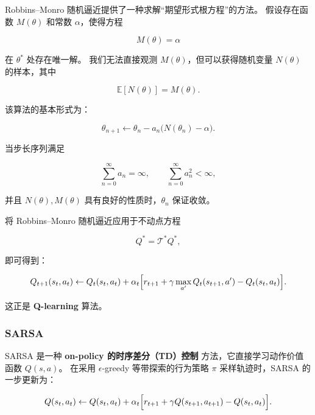 \documentclass[oneside]{ctexbook}
\begin{document}
Robbins--Monro 随机逼近提供了一种求解“期望形式根方程”的方法。
假设存在函数 $M(\theta)$ 和常数 $\alpha$，使得方程

\begin{equation}
M(\theta) = \alpha
\end{equation}

在 $\theta^\ast$ 处存在唯一解。
我们无法直接观测 $M(\theta)$，但可以获得随机变量 $N(\theta)$ 的样本，其中

\begin{equation}
\mathbb E[N(\theta)] = M(\theta).
\end{equation}

该算法的基本形式为：

\begin{equation}
\theta_{n+1}
\gets
\theta_n - a_n \bigl(N(\theta_n) - \alpha \bigr).
\end{equation}

当步长序列满足

\begin{equation}
\sum_{n=0}^\infty a_n = \infty,
\qquad
\sum_{n=0}^\infty a_n^2 < \infty,
\end{equation}

并且 $N(\theta), M(\theta)$ 具有良好的性质时，$\theta_n$ 保证收敛。

将 Robbins--Monro 随机逼近应用于不动点方程

\begin{equation}
Q^\ast = \mathcal T^\ast Q^\ast,
\end{equation}

即可得到：

\begin{equation}
Q_{t+1}(s_t,a_t)
\gets
Q_t(s_t,a_t)
+
\alpha_t
\Bigl[
r_{t+1}
+
\gamma \max_{a^\prime} Q_t(s_{t+1},a^\prime)
-
Q_t(s_t,a_t)
\Bigr].
\end{equation}

这正是 \textbf{Q-learning} 算法。

\subsubsection{SARSA}

SARSA 是一种 \textbf{on-policy 的时序差分（TD）控制} 方法，它直接学习动作价值函数 $Q(s,a)$。
在采用 $\epsilon$-greedy 等带探索的行为策略 $\pi$ 采样轨迹时，SARSA 的一步更新为：

\begin{equation}
Q(s_t,a_t)
\gets
Q(s_t,a_t)
+
\alpha_t
\Bigl[
r_{t+1}
+
\gamma Q(s_{t+1},a_{t+1})
-
Q(s_t,a_t)
\Bigr].
\end{equation}
\end{document}
